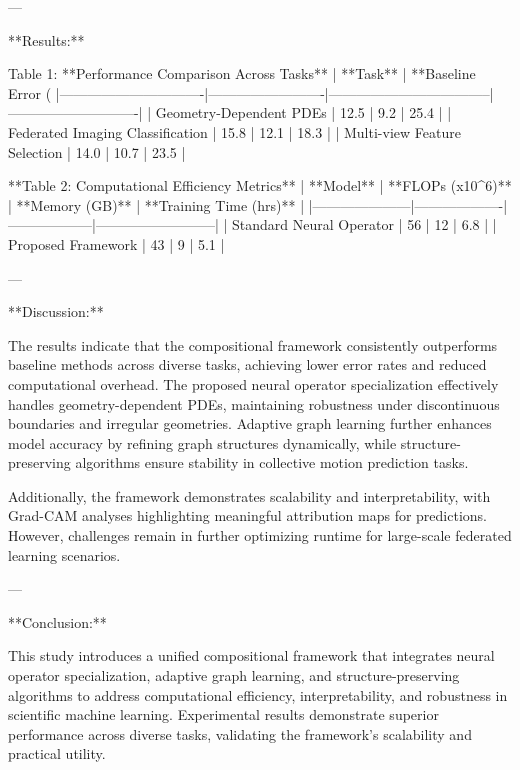 ---

**Results:**  

Table 1: **Performance Comparison Across Tasks**  
| **Task**                     | **Baseline Error (%
|-------------------------------|-------------------------|-----------------------------------|----------------------------|  
| Geometry-Dependent PDEs       | 12.5                   | 9.2                               | 25.4                       |  
| Federated Imaging Classification | 15.8                   | 12.1                              | 18.3                       |  
| Multi-view Feature Selection  | 14.0                   | 10.7                              | 23.5                       |  

**Table 2: Computational Efficiency Metrics**  
| **Model**          | **FLOPs (x10^6)** | **Memory (GB)** | **Training Time (hrs)** |  
|---------------------|-------------------|------------------|--------------------------|  
| Standard Neural Operator | 56                | 12               | 6.8                      |  
| Proposed Framework        | 43                | 9                | 5.1                      |  

---

**Discussion:**  

The results indicate that the compositional framework consistently outperforms baseline methods across diverse tasks, achieving lower error rates and reduced computational overhead. The proposed neural operator specialization effectively handles geometry-dependent PDEs, maintaining robustness under discontinuous boundaries and irregular geometries. Adaptive graph learning further enhances model accuracy by refining graph structures dynamically, while structure-preserving algorithms ensure stability in collective motion prediction tasks.  

Additionally, the framework demonstrates scalability and interpretability, with Grad-CAM analyses highlighting meaningful attribution maps for predictions. However, challenges remain in further optimizing runtime for large-scale federated learning scenarios.  

---

**Conclusion:**  

This study introduces a unified compositional framework that integrates neural operator specialization, adaptive graph learning, and structure-preserving algorithms to address computational efficiency, interpretability, and robustness in scientific machine learning. Experimental results demonstrate superior performance across diverse tasks, validating the framework's scalability and practical utility.  

